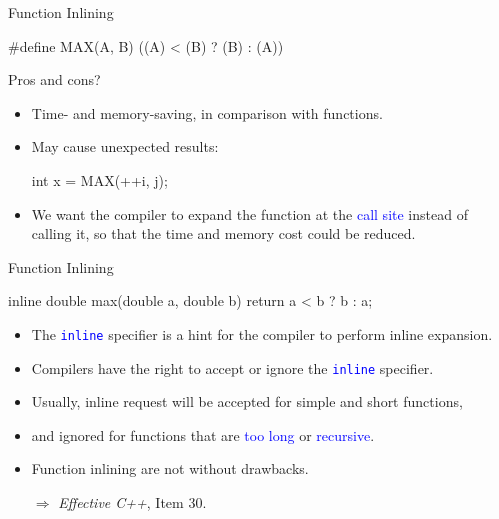 \documentclass[handout]{beamer}
\newcommand{\blue}[1]{\textcolor{blue}{#1}}
\newcommand{\ttt}[1]{\texttt{#1}}
\newcommand{\bluett}[1]{\blue{\ttt{#1}}}
\begin{document}
\begin{frame}[fragile]{Function Inlining}
	\begin{cpp}
#define MAX(A, B) ((A) < (B) ? (B) : (A))
	\end{cpp}
	Pros and cons?
	\pause
	\begin{itemize}
		\item Time- and memory-saving, in comparison with functions.
		\item May cause unexpected results:
		\begin{cpp}
int x = MAX(++i, j);
		\end{cpp}
		\pause
		\item We want the compiler to expand the function at the \blue{call site} instead of calling it, so that the time and memory cost could be reduced.
	\end{itemize}
\end{frame}

\begin{frame}[fragile]{Function Inlining}
	\begin{cpp}
inline double max(double a, double b) {
  return a < b ? b : a;
}
	\end{cpp}
	\begin{itemize}
		\item The \bluett{inline} specifier is a hint for the compiler to perform inline expansion.
		\item Compilers have the right to accept or ignore the \bluett{inline} specifier.
		\pause
		\item Usually, inline request will be accepted for simple and short functions,
		\item and ignored for functions that are \blue{too long} or \blue{recursive}.
		\pause
		\item Function inlining are not without drawbacks.
		\item[\(\Rightarrow\)] \textit{Effective C++}, Item 30.
	\end{itemize}
\end{frame}
\end{document}

